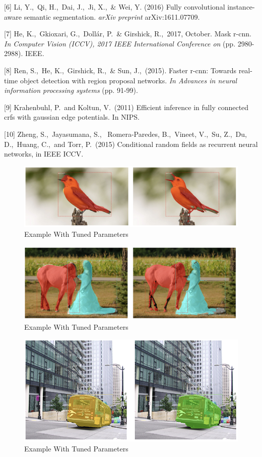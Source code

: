 \documentclass{article}
\begin{document}
[6] Li, Y.,\  Qi, H.,\  Dai, J.,\  Ji, X.,\  \& Wei, Y.  (2016) Fully convolutional instance-aware semantic segmentation. {\it arXiv preprint} arXiv:1611.07709.

[7] He, K.,\  Gkioxari, G.,\  Dollár, P.\  \& Girshick, R.,\  2017, October. Mask r-cnn. {\it In Computer Vision (ICCV), 2017 IEEE International Conference on} (pp. 2980-2988). IEEE.

[8] Ren, S.,\  He, K.,\  Girshick, R.,\  \& Sun, J.,\  (2015). Faster r-cnn: Towards real-time object detection with region proposal networks. {\it In Advances in neural information processing systems} (pp. 91-99).

[9] Krahenbuhl, P.\ and Koltun, V.\ (2011) Efficient inference in fully connected crfs with gaussian edge potentials. In NIPS.

[10] Zheng, S.,\ Jayasumana, S., \ Romera-Paredes, B.,\ Vineet, V.,\ Su, Z.,\ Du, D.,\ Huang, C.,\ and Torr, P.\ (2015) Conditional random fields as recurrent neural networks, in IEEE ICCV.

\begin{figure}
  \centering
  \includegraphics[width=14cm]{e1.png}
  \caption{Example With Tuned Parameters}
  \label{e1}
\end{figure}  

\begin{figure}
  \centering
  \includegraphics[width=14cm]{e2.png}
  \caption{Example With Tuned Parameters}
  \label{e2}
\end{figure}  

\begin{figure}
  \centering
  \includegraphics[width=14cm]{e3.png}
  \caption{Example With Tuned Parameters}
  \label{e3}
\end{figure}  
\end{document}
